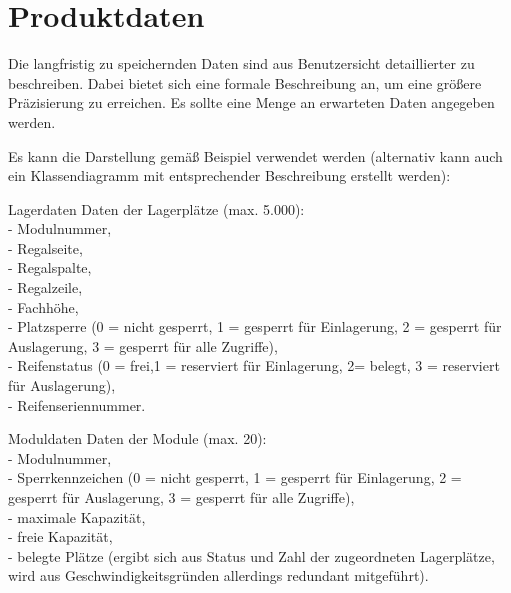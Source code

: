 
\chapter{Produktdaten}
\label{chap:product_data}

Die langfristig zu speichernden Daten sind aus Benutzersicht detaillierter zu
beschreiben. Dabei bietet sich eine formale Beschreibung an, um eine größere Präzisierung zu erreichen.
Es sollte eine Menge an erwarteten Daten angegeben werden.

Es kann die Darstellung gemäß Beispiel verwendet werden (alternativ kann auch ein Klassendiagramm mit entsprechender Beschreibung erstellt werden):\\

\begin{data}{10}{Lagerdaten}
	Daten der Lagerplätze (max. 5.000):\\
	-  Modulnummer,\\
	-  Regalseite,\\
	-  Regalspalte,\\
	-  Regalzeile,\\
	-  Fachhöhe,\\
	-  Platzsperre (0 = nicht gesperrt, 1 = gesperrt für Einlagerung, 2 = gesperrt
	   für Auslagerung, 3 = gesperrt für alle Zugriffe),\\
	-  Reifenstatus (0 = frei,1 = reserviert für Einlagerung, 2= belegt, 3 =
	   reserviert für Auslagerung),\\
	-  Reifenseriennummer.\\
\end{data}

\begin{data}{20}{Moduldaten}
	Daten der Module (max. 20):\\
	-  Modulnummer,\\
	-  Sperrkennzeichen (0 = nicht gesperrt, 1 = gesperrt für Einlagerung, 2 =
	   gesperrt für Auslagerung, 3 = gesperrt für alle Zugriffe),\\
	-  maximale Kapazität,\\
	-  freie Kapazität,\\
	-  belegte Plätze (ergibt sich aus Status und Zahl der zugeordneten
	   Lagerplätze, wird aus Geschwindigkeitsgründen allerdings redundant
	   mitgeführt).
\end{data}
